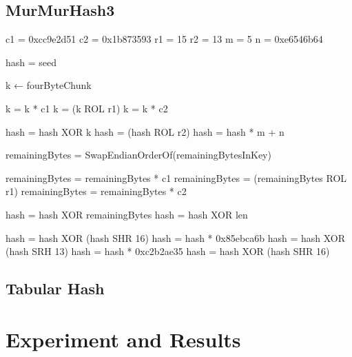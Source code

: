 \documentclass[11pt,oneside,a4paper]{article}
\begin{document}
\subsection{MurMurHash3}
\begin{algorithm}[H]
\begin{algorithmic}[1]

    \State c1 = 0xcc9e2d51
    \State c2 = 0x1b873593
    \State r1 = 15
    \State r2 = 13
   \State  m = 5
    \State n = 0xe6546b64

    \State hash  =  seed

         \State  k ← fourByteChunk

          \State k = k * c1
          \State k = (k ROL r1)
          \State k = k * c2

          \State hash = hash XOR k
          \State hash = (hash ROL r2)
          \State hash = hash * m + n
	\EndFor        
	


  \State      remainingBytes = SwapEndianOrderOf(remainingBytesInKey)

         \State  remainingBytes = remainingBytes * c1
          \State remainingBytes = (remainingBytes ROL r1)
          \State remainingBytes = remainingBytes * c2

         \State  hash = hash XOR remainingBytes
\EndFor
      \State hash = hash XOR len

     \State  hash = hash XOR (hash SHR 16)
      \State hash = hash * 0x85ebca6b
      \State hash = hash XOR (hash SRH 13)
      \State hash = hash * 0xc2b2ae35
      \State hash = hash XOR (hash SHR 16)
    \EndFunction
\end{algorithmic}
\end{algorithm}

\subsection{Tabular Hash}
\section{Experiment and Results}
\end{document}
